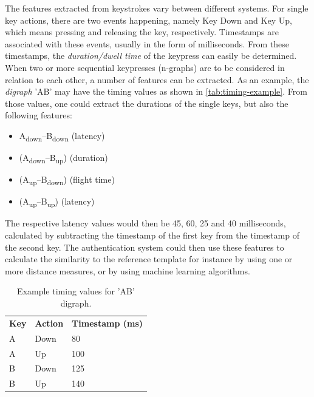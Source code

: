 \documentclass[informationsecurity]{gucmasterproject}
\begin{document}
The features extracted from keystrokes vary between different systems.
For single key actions, there are two events happening, namely Key Down and Key Up, which means pressing and releasing the key, respectively.
Timestamps are associated with these events, usually in the form of milliseconds.
From these timestamps, the \textit{duration/dwell time} of the keypress can easily be determined.
When two or more sequential keypresses (n-graphs) are to be considered in relation to each other, a number of features can be extracted.
As an example, the \textit{digraph} 'AB' may have the timing values as shown in \autoref{tab:timing-example}.
From those values, one could extract the durations of the single keys, but also the following features: 

\begin{itemize}
\item A\textsubscript{down}--B\textsubscript{down} (latency)
\item (A\textsubscript{down}--B\textsubscript{up}) (duration)
\item (A\textsubscript{up}--B\textsubscript{down}) (flight time)
\item (A\textsubscript{up}--B\textsubscript{up}) (latency)
\end{itemize}
The respective latency values would then be 45, 60, 25 and 40 milliseconds, calculated by subtracting the timestamp of the first key from the timestamp of the second key.
The authentication system could then use these features to calculate the similarity to the reference template for instance by using one or more distance measures, or by using machine learning algorithms.

\begin{table}[h]
    \centering
    \begin{tabular}{lll}
         \bf Key & \bf Action & \bf Timestamp (ms)\\
         A & Down & 80\\
         A & Up & 100\\
         B & Down & 125\\
         B & Up & 140
    \end{tabular}
    \caption{Example timing values for 'AB' digraph.}
    \label{tab:timing-example}
\end{table}
\end{document}
